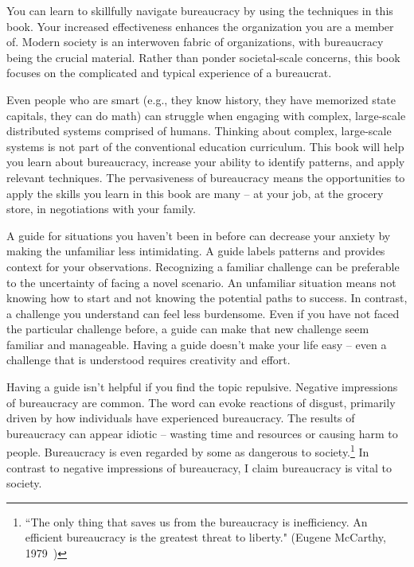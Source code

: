 You can learn to skillfully navigate bureaucracy by using the techniques in this book. 
Your increased effectiveness enhances the organization you are a member of. Modern society is an interwoven fabric of organizations, with  bureaucracy being the crucial material.
Rather than ponder societal-scale concerns, this book focuses on the complicated and typical experience of a bureaucrat. 

Even people who are smart (e.g., they know history, they have memorized state capitals, they can do math) can struggle when engaging with complex, large-scale distributed systems comprised of humans. Thinking about complex, large-scale systems is not part of the conventional education curriculum. This book will help you learn about bureaucracy, increase your ability to identify patterns, and apply relevant techniques. The pervasiveness of bureaucracy means the opportunities to apply the skills you learn in this book are many -- at your job, at the grocery store, in negotiations with your family.

A guide for situations you haven't been in before can decrease your anxiety by making the unfamiliar less intimidating. 
A guide labels patterns and provides context for your observations. 
Recognizing a familiar challenge can be preferable to the uncertainty of facing a novel scenario. An unfamiliar situation means not knowing how to start and not knowing the potential paths to success. In contrast, a challenge you understand can feel less burdensome. 
Even if you have not faced the particular challenge before, a guide can make that new challenge seem familiar and manageable. 
Having a guide doesn't make your life easy -- even a challenge that is understood requires creativity and effort.



Having a guide isn't helpful if you find the topic repulsive.
Negative impressions of bureaucracy are common. The word
can evoke reactions of disgust, primarily driven by how individuals have experienced bureaucracy.
The results of bureaucracy can appear idiotic -- 
wasting time and resources or causing harm to people.
Bureaucracy is even regarded by some as dangerous to society.\footnote{``The only thing that saves us from the bureaucracy is inefficiency. An efficient bureaucracy is the greatest threat to liberty." (Eugene McCarthy, 1979~\cite{1979_McCarthy})}
In contrast to negative impressions of bureaucracy, I claim bureaucracy is vital to society. 


